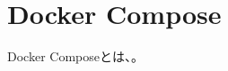\documentclass[10pt,a4j,openany,dvipdfmx]{jsarticle}
\begin{document}
\section{Docker Compose} %
\label{sec:docker_compose}

\begin{tcolorbox}[
title=Docker Compose, fonttitle=\bfseries]
Docker Composeとは、。
\end{tcolorbox}

\end{document}
